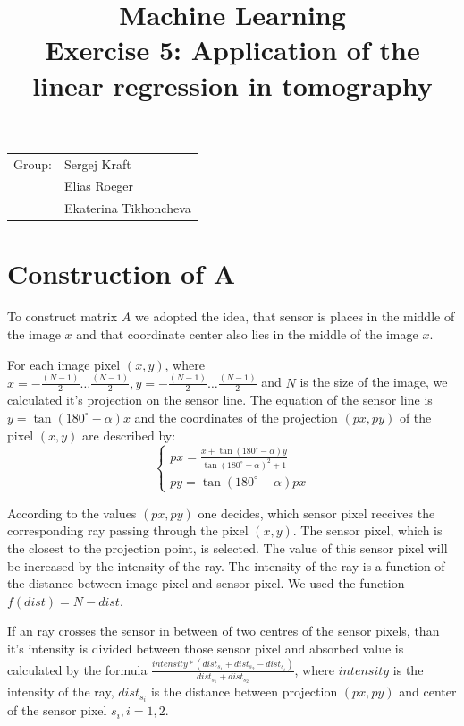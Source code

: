 \documentclass{article}
\title{Machine Learning \\ \bf{Exercise 5: Application of the linear regression
								in tomography} } %
\begin{document}
\maketitle

\begin{center}
\begin{tabular}{l l}
Group: &  Sergej Kraft \\
       & Elias Roeger \\
       & Ekaterina Tikhoncheva \\ 
\end{tabular}
\end{center}

\tableofcontents

\section{Construction of A}

To construct matrix $A$ we adopted the idea, that sensor is places in the middle of the image $x$ and that coordinate center also lies in the middle of the image $x$.

For each image pixel $(x,y)$, where $x=-\frac{(N-1)}{2}\dots\frac{(N-1)}{2}, y=-\frac{(N-1)}{2}\dots\frac{(N-1)}{2}$ and $N$ is the size of the image, we calculated it's projection on the sensor line. The equation of the sensor line is $y=\tan(180^\circ-\alpha) x$ and the coordinates of the projection $(px,py)$ of the pixel $(x,y)$ are described by:
$$\begin{cases}
px = \frac{x+\tan(180^\circ-\alpha)y}{\tan(180^\circ-\alpha)^2+1} \\
py = \tan(180^\circ-\alpha) px
\end{cases}$$

According to the values $(px,py)$ one decides, which sensor pixel receives the corresponding ray passing through the pixel $(x,y)$. The sensor pixel, which is the closest to the projection point, is selected. The value of this sensor pixel will be increased by the intensity of the ray. The intensity of the ray is a function of the distance between image pixel and sensor pixel. We used the function $f(dist) = N - dist$.

If an ray crosses the sensor in between of two centres of the sensor pixels, than it's intensity is divided between those sensor pixel and absorbed value is calculated by the formula $\frac{intensity*(dist_{s_1}+dist_{s_2} - dist_{s_i})}{dist_{s_1}+dist_{s_2}}$, where $intensity$ is the intensity of the ray, $dist_{s_i}$ is the distance between projection $(px, py)$ and center of the sensor pixel $s_i, i=1,2$.
\end{document}
